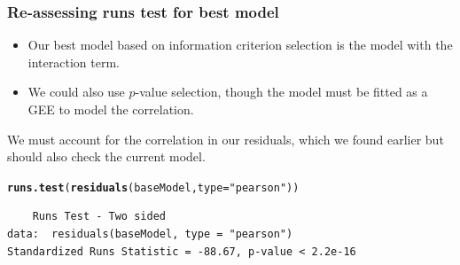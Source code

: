 \documentclass[11pt, a4paper]{article}
\makeatletter
\newcommand{\hlfunctioncall}[1]{\textcolor[rgb]{0.501960784313725,0,0.329411764705882}{\textbf{#1}}}%
\newcommand{\hlstring}[1]{\textcolor[rgb]{0.6,0.6,1}{#1}}%
\newenvironment{kframe}{%
 \def\at@end@of@kframe{}%
 \ifinner\ifhmode%
  \def\at@end@of@kframe{\end{minipage}}%
  \begin{minipage}{\columnwidth}%
 \fi\fi%
 \def\FrameCommand##1{\hskip\@totalleftmargin \hskip-\fboxsep
 \colorbox{shadecolor}{##1}\hskip-\fboxsep
     \hskip-\linewidth \hskip-\@totalleftmargin \hskip\columnwidth}%
 \MakeFramed {\advance\hsize-\width
   \@totalleftmargin\z@ \linewidth\hsize
   \@setminipage}}%
 {\par\unskip\endMakeFramed%
 \at@end@of@kframe}
\newenvironment{knitrout}{}{} %
\makeatother
\begin{document}
\begin{frame}[fragile]
\frametitle{Re-assessing runs test for best model}
\begin{itemize}
\item Our best model based on information criterion selection is the model with the interaction term. 
\item We could also use $p$-value selection, though the model must be fitted as a GEE to model the correlation.
\end{itemize}

We must account for the correlation in our residuals, which we found earlier but should also check the current model.
\begin{knitrout}\footnotesize
{}\color{fgcolor}\begin{kframe}
\begin{alltt}
\hlfunctioncall{runs.test}(\hlfunctioncall{residuals}(baseModel, type = \hlstring{"pearson"}))
\end{alltt}
\begin{verbatim}
	Runs Test - Two sided
data:  residuals(baseModel, type = "pearson") 
Standardized Runs Statistic = -88.67, p-value < 2.2e-16
\end{verbatim}
\end{kframe}
\end{knitrout}
\end{frame}
\end{document}
